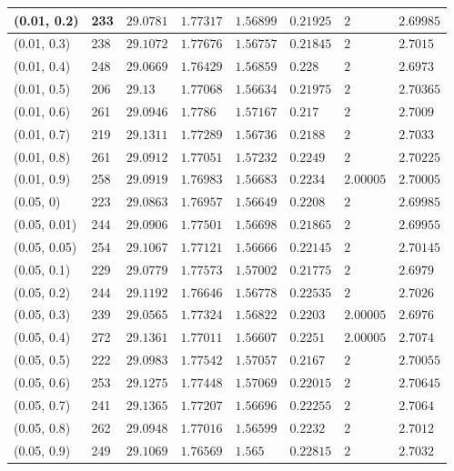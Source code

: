 \begin{center}
{\begin{longtable}{| l | p{} |  p{} | p{} | p{} | p{} | p{} | p{} |}
 (0.01, 0.2) & 233  & $29.0781$ & $1.77317$ & $1.56899$ & $0.21925$ & $2$ & $2.69985$ \\ \hline
 (0.01, 0.3) & 238  & $29.1072$ & $1.77676$ & $1.56757$ & $0.21845$ & $2$ & $2.7015$ \\ \hline
 (0.01, 0.4) & 248  & $29.0669$ & $1.76429$ & $1.56859$ & $0.228$ & $2$ & $2.6973$ \\ \hline
 (0.01, 0.5) & 206  & $29.13$ & $1.77068$ & $1.56634$ & $0.21975$ & $2$ & $2.70365$ \\ \hline
 (0.01, 0.6) & 261  & $29.0946$ & $1.7786$ & $1.57167$ & $0.217$ & $2$ & $2.7009$ \\ \hline
 (0.01, 0.7) & 219  & $29.1311$ & $1.77289$ & $1.56736$ & $0.2188$ & $2$ & $2.7033$ \\ \hline
 (0.01, 0.8) & 261  & $29.0912$ & $1.77051$ & $1.57232$ & $0.2249$ & $2$ & $2.70225$ \\ \hline
 (0.01, 0.9) & 258  & $29.0919$ & $1.76983$ & $1.56683$ & $0.2234$ & $2.00005$ & $2.70005$ \\ \hline
 (0.05, 0) & 223  & $29.0863$ & $1.76957$ & $1.56649$ & $0.2208$ & $2$ & $2.69985$ \\ \hline
 (0.05, 0.01) & 244  & $29.0906$ & $1.77501$ & $1.56698$ & $0.21865$ & $2$ & $2.69955$ \\ \hline
 (0.05, 0.05) & 254  & $29.1067$ & $1.77121$ & $1.56666$ & $0.22145$ & $2$ & $2.70145$ \\ \hline
 (0.05, 0.1) & 229  & $29.0779$ & $1.77573$ & $1.57002$ & $0.21775$ & $2$ & $2.6979$ \\ \hline
 (0.05, 0.2) & 244  & $29.1192$ & $1.76646$ & $1.56778$ & $0.22535$ & $2$ & $2.7026$ \\ \hline
 (0.05, 0.3) & 239  & $29.0565$ & $1.77324$ & $1.56822$ & $0.2203$ & $2.00005$ & $2.6976$ \\ \hline
 (0.05, 0.4) & 272  & $29.1361$ & $1.77011$ & $1.56607$ & $0.2251$ & $2.00005$ & $2.7074$ \\ \hline
 (0.05, 0.5) & 222  & $29.0983$ & $1.77542$ & $1.57057$ & $0.2167$ & $2$ & $2.70055$ \\ \hline
 (0.05, 0.6) & 253  & $29.1275$ & $1.77448$ & $1.57069$ & $0.22015$ & $2$ & $2.70645$ \\ \hline
 (0.05, 0.7) & 241  & $29.1365$ & $1.77207$ & $1.56696$ & $0.22255$ & $2$ & $2.7064$ \\ \hline
 (0.05, 0.8) & 262  & $29.0948$ & $1.77016$ & $1.56599$ & $0.2232$ & $2$ & $2.7012$ \\ \hline
 (0.05, 0.9) & 249  & $29.1069$ & $1.76569$ & $1.565$ & $0.22815$ & $2$ & $2.7032$ \\ \hline

\end{longtable}}
\end{center}
